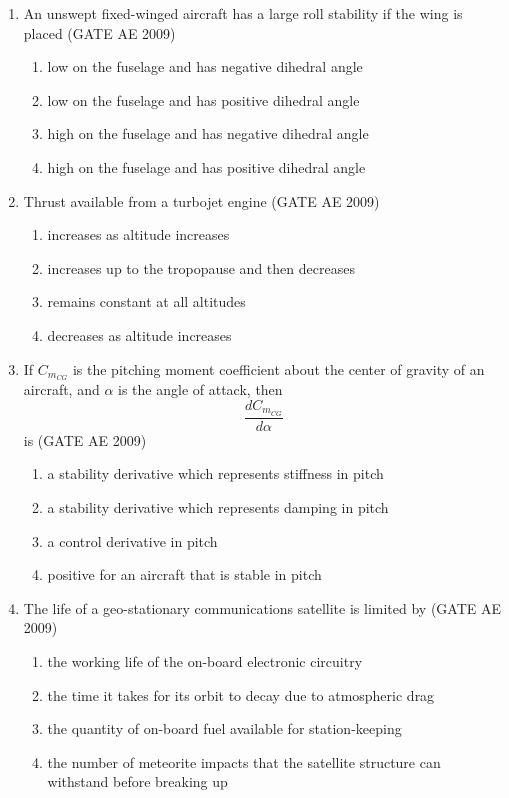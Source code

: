 \documentclass[journal,12pt,onecolumn]{IEEEtran}
\theoremstyle{remark}
\begin{document}
\begin{flushleft}
\begin{enumerate}
\item 
An unswept fixed-winged aircraft has a large roll stability if the wing is placed
\hfill(GATE AE 2009)
\begin{multicols}{2}
\begin{enumerate}
\item low on the fuselage and has negative dihedral angle
\item low on the fuselage and has positive dihedral angle
\item high on the fuselage and has negative dihedral angle
\item high on the fuselage and has positive dihedral angle
\end{enumerate}
\end{multicols}

\item 
Thrust available from a turbojet engine
\hfill(GATE AE 2009)
\begin{multicols}{2}
\begin{enumerate}
\item increases as altitude increases
\item increases up to the tropopause and then decreases
\item remains constant at all altitudes
\item decreases as altitude increases
\end{enumerate}
\end{multicols}

\item 
If \(C_{m_{CG}}\) is the pitching moment coefficient about the center of gravity of an aircraft, and \(\alpha\) is the angle of attack, then
\[
\frac{dC_{m_{CG}}}{d\alpha}
\]
is
\hfill(GATE AE 2009)

\begin{enumerate}
\item a stability derivative which represents stiffness in pitch
\item a stability derivative which represents damping in pitch
\item a control derivative in pitch
\item positive for an aircraft that is stable in pitch
\end{enumerate}

\item 
The life of a geo-stationary communications satellite is limited by
\hfill(GATE AE 2009)

\begin{enumerate}
\item the working life of the on-board electronic circuitry
\item the time it takes for its orbit to decay due to atmospheric drag
\item the quantity of on-board fuel available for station-keeping
\item the number of meteorite impacts that the satellite structure can withstand before breaking up
\end{enumerate}


\end{enumerate}
\end{flushleft}
\end{document}
